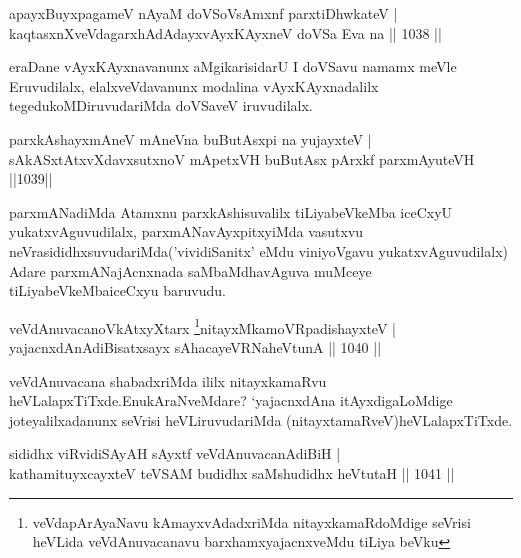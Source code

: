 \begin{shl}
apayxBuyxpagameV nAyaM doVSoV\s sAmxnf parxtiDhwkateV |\\
kaqtasxnXveVdagarxhAdAdayxvAyxKAyxneV doVSa Eva na || 1038 ||
\end{shl}

\begin{artha}
eraDane vAyxKAyxnavanunx aMgikarisidarU I doVSavu namamx meVle Eruvudilalx, 
elalxveVdavanunx modalina vAyxKAyxnadalilx tegedukoMDiruvudariMda doVSaveV iruvudilalx.
\end{artha}


\begin{shl}
parxkAshayxmAneV mAneVna buButAsx\s pi na yujayxteV |\\
sAkASxtAtxvXdavxsutxnoV mApetxVH buButAsx pArxkf parxmAyuteVH ||1039||
\end{shl}

\begin{artha}
parxmANadiMda Atamxnu parxkAshisuvalilx tiLiyabeVkeMba iceCxyU yukatxvAguvudilalx, parxmANavAyxpitxyiMda vasutxvu neVrasididhxsuvudariMda('vividiSanitx' eMdu viniyoVgavu yukatxvAguvudilalx) Adare parxmANajAcnxnada saMbaMdhavAguva muMceye tiLiyabeVkeMba\break iceCxyu baruvudu.
\end{artha}



\begin{shl}
veVdAnuvacanoVkAtxyX\s tarx \footnote{veVdapArAyaNavu kAmayxvAdadxriMda nitayxkamaRdoMdige seVrisi heVLida veVdAnuvacanavu barxhamxyajacnxveMdu tiLiya beVku}nitayxMkamoVRpadishayxteV |\\
yajacnxdAnAdiBisatxsayx sAhacayeVRNaheVtunA || 1040 ||
\end{shl}

\begin{artha}
veVdAnuvacana shabadxriMda ililx nitayxkamaRvu heVLalapxTiTxde.\break EnukAraNveMdare? `yajacnxdAna itAyxdigaLoMdige joteyalilx\break adanunx seVrisi heVLiruvudariMda (nitayxtamaRveV)heVLalapxTiTxde.
\end{artha}

\begin{shl}
sididhx viRvidiSAyAH sAyxtf veVdAnuvacanAdiBiH |\\
kathamituyxcayxteV teVSAM budidhx saMshudidhx heVtutaH || 1041 ||
\end{shl}

